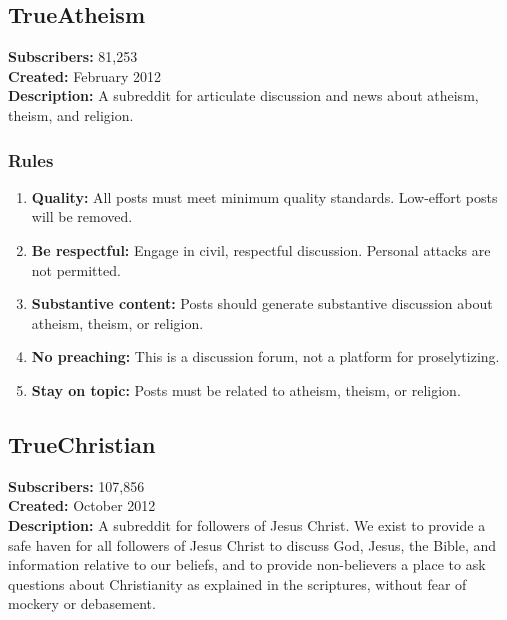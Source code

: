 \subsection{TrueAtheism}
\textbf{Subscribers:} 81,253 \\
\textbf{Created:} February 2012 \\
\textbf{Description:} A subreddit for articulate discussion and news about atheism, theism, and religion.

\subsubsection{Rules}
\begin{enumerate}
    \item \textbf{Quality:} All posts must meet minimum quality standards. Low-effort posts will be removed.
    
    \item \textbf{Be respectful:} Engage in civil, respectful discussion. Personal attacks are not permitted.
    
    \item \textbf{Substantive content:} Posts should generate substantive discussion about atheism, theism, or religion.
    
    \item \textbf{No preaching:} This is a discussion forum, not a platform for proselytizing.
    
    \item \textbf{Stay on topic:} Posts must be related to atheism, theism, or religion.
\end{enumerate}

\subsection{TrueChristian}
\textbf{Subscribers:} 107,856 \\
\textbf{Created:} October 2012 \\
\textbf{Description:} A subreddit for followers of Jesus Christ. We exist to provide a safe haven for all followers of Jesus Christ to discuss God, Jesus, the Bible, and information relative to our beliefs, and to provide non-believers a place to ask questions about Christianity as explained in the scriptures, without fear of mockery or debasement.

